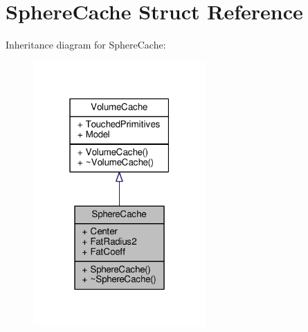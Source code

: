 \hypertarget{structSphereCache}{}\section{Sphere\+Cache Struct Reference}
\label{structSphereCache}


Inheritance diagram for Sphere\+Cache\+:
\nopagebreak
\begin{figure}[H]
\begin{center}
\leavevmode
\includegraphics[width=187pt]{dc/d02/structSphereCache__inherit__graph}
\end{center}
\end{figure}


